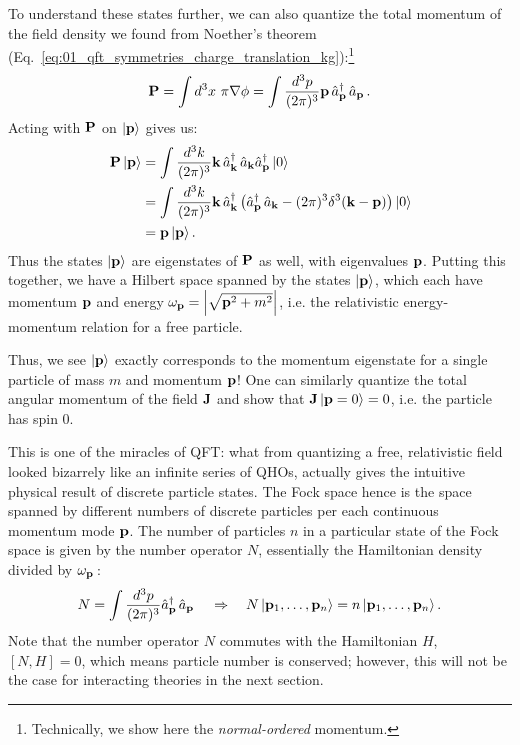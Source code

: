 To understand these states further, we can also quantize the total momentum of the field density we found from Noether's theorem (Eq.~\ref{eq:01_qft_symmetries_charge_translation_kg}):\footnote{Technically, we show here the \textit{normal-ordered} momentum.}
\begin{equation}
    \label{eq:01_qft_quantization_momentum}
    \mathbf{P} = \int d^3x\ \pi\mathbf{\nabla}\phi = \int \frac{d^3p}{(2\pi)^3} \mathbf{p}\, \hat a^\dagger_{\mathbf{p}}\, \hat a_{\mathbf{p}}\,.
\end{equation}
Acting with $\mathbf{P}$ on $\ket{\mathbf{p}}$ gives us:
\begin{equation}
    \label{eq:01_qft_quantization_momentum_states}
    \begin{split}\,
    \mathbf{P}\ket{\mathbf{p}} &= \int \frac{d^3k}{(2\pi)^3} \mathbf{k}\, \hat a^\dagger_{\mathbf{k}}\, \hat a_{\mathbf{k}} \hat a^\dagger_{\mathbf{p}} \ket{0} \\
    &= \int \frac{d^3k}{(2\pi)^3} \mathbf{k}\, \hat a^\dagger_{\mathbf{k}}\, \big(\hat a^\dagger_{\mathbf{p}}\, \hat a_{\mathbf{k}} - (2\pi)^3 \delta^3(\mathbf{k} - \mathbf{p})\big) \ket{0} \\
    &= \mathbf{p}\ket{\mathbf{p}}.
    \end{split}
\end{equation}
Thus the states $\ket{\mathbf{p}}$ are eigenstates of $\mathbf{P}$ as well, with eigenvalues $\mathbf{p}$.
Putting this together, we have a Hilbert space spanned by the states $\ket{\mathbf{p}}$, which each have momentum $\mathbf{p}$ and energy $\omega_{\mathbf{p}} = \left\lvert \sqrt{\mathbf{p}^2 + m^2} \right\rvert$, i.e. the relativistic energy-momentum relation for a free particle.

Thus, we see $\ket{\mathbf{p}}$ exactly corresponds to the momentum eigenstate for a single particle of mass $m$ and momentum $\mathbf{p}$!
One can similarly quantize the total angular momentum of the field $\mathbf{J}$ and show that $\mathbf{J}\ket{\mathbf{p} = 0} = 0$, i.e. the particle has spin 0.

This is one of the miracles of QFT: what from quantizing a free, relativistic field looked bizarrely like an infinite series of QHOs, actually gives the intuitive physical result of discrete particle states.
The Fock space hence is the space spanned by different numbers of discrete particles per each continuous momentum mode $\mathbf{p}$.
The number of particles $n$ in a particular state of the Fock space is given by the number operator $N$, essentially the Hamiltonian density divided by $\omega_{\mathbf{p}}\,$:
\begin{equation}
    \label{eq:01_qft_quantization_number}
    N = \int \frac{d^3p}{(2\pi)^3} \hat a^\dagger_{\mathbf{p}}\, \hat a_{\mathbf{p}}\, \quad \Rightarrow \quad N\ket{\mathbf{p}_1, \ldots, \mathbf{p}_n} = n\ket{\mathbf{p}_1, \ldots, \mathbf{p}_n}.
\end{equation}
Note that the number operator $N$ commutes with the Hamiltonian $H$, $[N, H] = 0$, which means particle number is conserved; however, this will not be the case for interacting theories in the next section.

